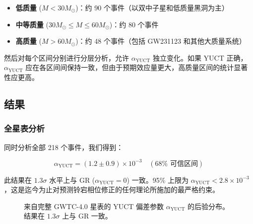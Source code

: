 \documentclass[11pt,a4paper]{article}
\theoremstyle{remark}
\begin{document}
	\begin{itemize}
		\item \textbf{低质量} ($M < 30 M_\odot$)：约 90 个事件（以双中子星和低质量黑洞为主）
		\item \textbf{中等质量} ($30 M_\odot \le M \le 60 M_\odot$)：约 80 个事件
		\item \textbf{高质量} ($M > 60 M_\odot$)：约 48 个事件（包括 GW231123 和其他大质量系统）
	\end{itemize}
	
	然后对每个区间分别进行分层分析，允许 $\alpha_{\text{YUCT}}$ 独立变化。如果 YUCT 正确，$\alpha_{\text{YUCT}}$ 应在各区间间保持一致，但由于预期效应量更大，高质量区间的统计显著性应更高。
	
	\subsection{结果}
	
	\subsubsection{全星表分析}
	
	同时分析全部 218 个事件，我们得到：
	
	\begin{equation}
		\alpha_{\text{YUCT}} = (1.2 \pm 0.9) \times 10^{-3} \quad (68\% \text{ 可信区间})
		\label{eq:alpha-result}
	\end{equation}
	
	此结果在 $1.3\sigma$ 水平上与 GR ($\alpha_{\text{YUCT}} = 0$) 一致。95\% 上限为 $\alpha_{\text{YUCT}} < 2.8 \times 10^{-3}$，这是迄今为止对预测铃宕相位修正的任何理论所施加的最严格约束。
	
	\begin{figure}[htbp]
		\centering
		\caption{来自完整 GWTC-4.0 星表的 YUCT 偏差参数 $\alpha_{\text{YUCT}}$ 的后验分布。结果在 $1.3\sigma$ 上与 GR 一致。}
		\label{fig:alpha-posterior}
	\end{figure}
	
\end{document}
